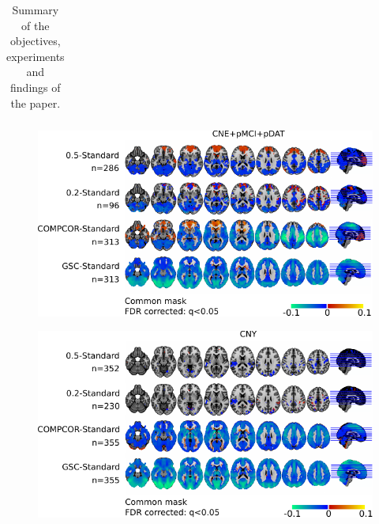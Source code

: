 \documentclass[authoryear]{elsarticle}
\begin{document}
\begin{landscape}
\begin{table}[tbp]
\begin{center}
\begin{tabular}{p{6cm}p{6cm}p{10cm}}
  \end{tabular}
 \end{center}
 \caption{Summary of the objectives, experiments and findings of the paper.}
\label{tab_summary}
\end{table}
\end{landscape}


\begin{figure}[tbp]
\begin{center}
\includegraphics[width=\linewidth]{../figures/figure_comp.pdf}
\end{center}
\caption{
}
\label{fig_comp}
\end{figure}


\begin{figure}[tbp]
\begin{center}
\includegraphics[width=\linewidth]{../figures/figure_comp_cny.pdf}
\end{center}
\caption{
}
\label{fig_comp_cny}
\end{figure}
\end{document}
